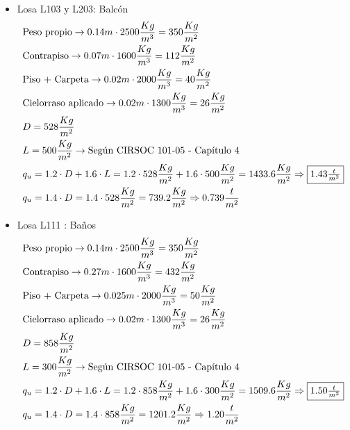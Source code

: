 \begin{enumerate}
\begin{itemize}
\item Losa L103 y L203: Balcón
\begin{align*}
& \text{Peso propio} \rightarrow 0.14m \cdot 2500 \frac{Kg}{m^3} = 350 \frac{Kg}{m^2}\\
& \text{Contrapiso} \rightarrow 0.07m \cdot 1600 \frac{Kg}{m^3} = 112 \frac{Kg}{m^2}\\
& \text{Piso + Carpeta} \rightarrow 0.02m \cdot 2000 \frac{Kg}{m^3} = 40 \frac{Kg}{m^2}\\
& \text{Cielorraso aplicado} \rightarrow  0.02m \cdot 1300 \frac{Kg}{m^3} = 26 \frac{Kg}{m^2}\\
& D = 528 \frac{Kg}{m^2}\\
& L = 500 \frac{Kg}{m^2} \rightarrow \text{Según CIRSOC 101-05 - Capítulo 4}\\
& q_u = 1.2 \cdot D + 1.6 \cdot L = 1.2 \cdot 528 \frac{Kg}{m^2} + 1.6 \cdot 500 \frac{Kg}{m^2} = 1433.6 \frac{Kg}{m^2} \Rightarrow \framebox{$1.43 \frac{t}{m^2}$} \\
& q_u = 1.4 \cdot D = 1.4 \cdot 528 \frac{Kg}{m^2} = 739.2 \frac{Kg}{m^2} \Rightarrow 0.739 \frac{t}{m^2}
\end{align*}

\item Losa L111 : Baños
\begin{align*}
& \text{Peso propio} \rightarrow 0.14m \cdot 2500 \frac{Kg}{m^3} = 350 \frac{Kg}{m^2}\\
& \text{Contrapiso} \rightarrow 0.27m \cdot 1600 \frac{Kg}{m^3} = 432 \frac{Kg}{m^2}\\
& \text{Piso + Carpeta} \rightarrow 0.025m \cdot 2000 \frac{Kg}{m^3} = 50 \frac{Kg}{m^2}\\
& \text{Cielorraso aplicado} \rightarrow  0.02m \cdot 1300 \frac{Kg}{m^3} = 26 \frac{Kg}{m^2}\\
& D = 858 \frac{Kg}{m^2}\\
& L = 300 \frac{Kg}{m^2} \rightarrow \text{Según CIRSOC 101-05 - Capítulo 4}\\
& q_u = 1.2 \cdot D + 1.6 \cdot L = 1.2 \cdot 858 \frac{Kg}{m^2} + 1.6 \cdot 300 \frac{Kg}{m^2} = 1509.6 \frac{Kg}{m^2} \Rightarrow \framebox{$1.50 \frac{t}{m^2}$}\\
& q_u = 1.4 \cdot D = 1.4 \cdot 858 \frac{Kg}{m^2} = 1201.2 \frac{Kg}{m^2} \Rightarrow 1.20 \frac{t}{m^2}
\end{align*}


\end{itemize}
\end{enumerate}
